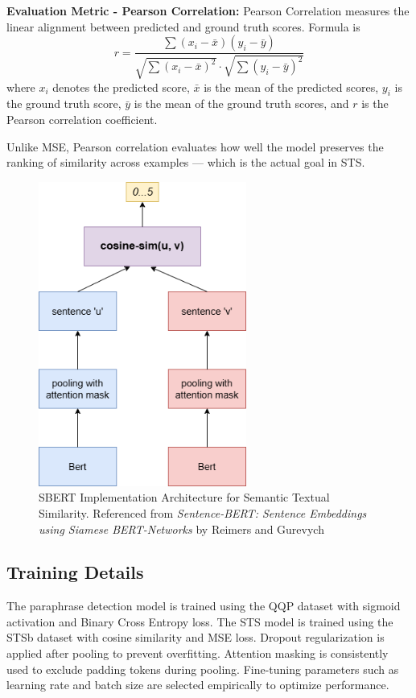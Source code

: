 \textbf{Evaluation Metric - Pearson Correlation:}
Pearson Correlation measures the linear alignment between predicted and ground truth scores. Formula is
\[
r = \frac{\sum (x_i - \bar{x})(y_i - \bar{y})}{\sqrt{\sum (x_i - \bar{x})^2} \cdot \sqrt{\sum (y_i - \bar{y})^2}}
\]
where \( x_i \) denotes the predicted score, \( \bar{x} \) is the mean of the predicted scores, \( y_i \) is the ground truth score, \( \bar{y} \) is the mean of the ground truth scores, and \( r \) is the Pearson correlation coefficient.

Unlike MSE, Pearson correlation evaluates how well the model preserves the ranking of similarity across examples — which is the actual goal in STS.

\begin{figure}[H]
    \centering
    \includegraphics[height=10cm]{Figures/SBERT_STS.png}
    \caption{SBERT Implementation Architecture for Semantic Textual Similarity. Referenced from \textit{Sentence-BERT: Sentence Embeddings using Siamese BERT-Networks} by Reimers and Gurevych~\cite{reimers2019sentence}}
    \label{fig:sbert_sts_architecture}
\end{figure}

\subsection{Training Details}
The paraphrase detection model is trained using the QQP dataset with sigmoid activation and Binary Cross Entropy loss. The STS model is trained using the STSb dataset with cosine similarity and MSE loss. Dropout regularization is applied after pooling to prevent overfitting. Attention masking is consistently used to exclude padding tokens during pooling. Fine-tuning parameters such as learning rate and batch size are selected empirically to optimize performance.